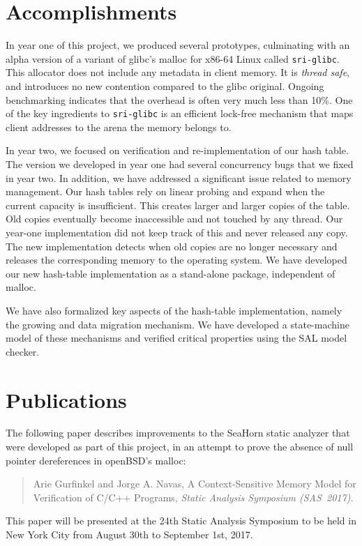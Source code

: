 \documentclass[twoside,12pt]{cslreport}
\begin{document}
\section{Accomplishments}

In  year  one  of  this   project,  we  produced  several  prototypes,
culminating with an  alpha version of a variant of  glibc's malloc for
x86-64  Linux  called  \texttt{sri-glibc}.  This  allocator  does  not
include any metadata in client memory.  It is {\em thread safe\/}, and
introduces no new  contention compared to the  glibc original. Ongoing
benchmarking indicates that the overhead  is often very much less than
10\%.   One  of  the  key  ingredients  to  \texttt{sri-glibc}  is  an
efficient lock-free mechanism that maps  client addresses to the arena
the memory belongs to.

In year two, we focused on verification and re-implementation of our
hash table. The version we developed in year one had several
concurrency bugs that we fixed in year two. In addition, we have
addressed a significant issue related to memory management. Our hash
tables rely on linear probing and expand when the current capacity is
insufficient. This creates larger and larger copies of the table. Old
copies eventually become inaccessible and not touched by any
thread. Our year-one implementation did not keep track of this and
never released any copy. The new implementation detects when old
copies are no longer necessary and releases the corresponding memory
to the operating system. We have developed our new hash-table
implementation as a stand-alone package, independent of malloc.

We have also formalized key aspects of the hash-table implementation,
namely the growing and data migration mechanism. We have developed a
state-machine model of these mechanisms and verified critical
properties using the SAL model checker.


\section{Publications}

The following paper describes improvements to the SeaHorn static
analyzer that were developed as part of this project, in an attempt to
prove the absence of null pointer dereferences in openBSD's malloc:
\begin{quote}
  Arie Gurfinkel and Jorge A. Navas, A Context-Sensitive Memory Model
  for Verification of C/C++ Programs, {\em Static Analysis Symposium
    (SAS~2017)\/}.
\end{quote}
This paper will be presented at the 24th Static Analysis Symposium
to be held in New York City from August 30th to September 1st, 2017.
\end{document}
